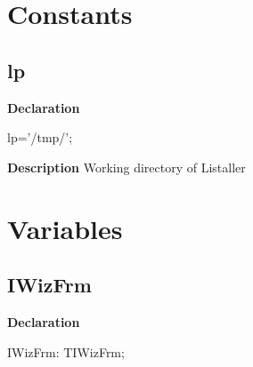 \documentclass{report}
\newif\ifpdf
\begin{document}
\section{Constants}
\ifpdf
\subsection*{\large{\textbf{lp}}\normalsize\hspace{1ex}\hrulefill}
\else
\subsection*{lp}
\fi
\label{imainunit-lp}
\begin{list}{}{
\setlength{\itemindent}{0cm}
\setlength{\listparindent}{0cm}
\setlength{\leftmargin}{\evensidemargin}
\addtolength{\leftmargin}{\tmplength}
\settowidth{\labelsep}{X}
\addtolength{\leftmargin}{\labelsep}
\setlength{\labelwidth}{\tmplength}
}
\item[\textbf{Declaration}\hfill]
\ifpdf
\begin{flushleft}
\fi
\begin{ttfamily}
lp='/tmp/';\end{ttfamily}

\ifpdf
\end{flushleft}
\fi

\par
\item[\textbf{Description}]
Working directory of Listaller

\end{list}
\section{Variables}
\ifpdf
\subsection*{\large{\textbf{IWizFrm}}\normalsize\hspace{1ex}\hrulefill}
\else
\subsection*{IWizFrm}
\fi
\label{imainunit-IWizFrm}
\begin{list}{}{
\setlength{\itemindent}{0cm}
\setlength{\listparindent}{0cm}
\setlength{\leftmargin}{\evensidemargin}
\addtolength{\leftmargin}{\tmplength}
\settowidth{\labelsep}{X}
\addtolength{\leftmargin}{\labelsep}
\setlength{\labelwidth}{\tmplength}
}
\item[\textbf{Declaration}\hfill]
\ifpdf
\begin{flushleft}
\fi
\begin{ttfamily}
IWizFrm: TIWizFrm;\end{ttfamily}

\ifpdf
\end{flushleft}
\fi

\end{list}
\ifpdf
\end{document}
